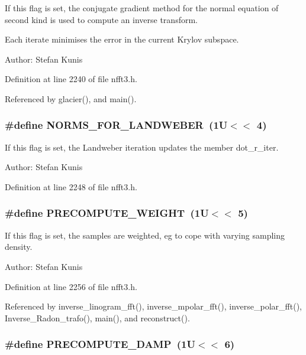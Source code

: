 If this flag is set, the conjugate gradient method for the normal equation of second kind is used to compute an inverse transform. 

Each iterate minimises the error in the current Krylov subspace.

\begin{Desc}
\item[Author:]Stefan Kunis \end{Desc}


Definition at line 2240 of file nfft3.h.

Referenced by glacier(), and main().\hypertarget{group__solver_ga39}{
\subsubsection[NORMS\_\-FOR\_\-LANDWEBER]{\setlength{\rightskip}{0pt plus 5cm}\#define NORMS\_\-FOR\_\-LANDWEBER~(1U$<$$<$ 4)}}
\label{group__solver_ga39}


If this flag is set, the Landweber iteration updates the member dot\_\-r\_\-iter. 

\begin{Desc}
\item[Author:]Stefan Kunis \end{Desc}


Definition at line 2248 of file nfft3.h.\hypertarget{group__solver_ga40}{
\subsubsection[PRECOMPUTE\_\-WEIGHT]{\setlength{\rightskip}{0pt plus 5cm}\#define PRECOMPUTE\_\-WEIGHT~(1U$<$$<$ 5)}}
\label{group__solver_ga40}


If this flag is set, the samples are weighted, eg to cope with varying sampling density. 

\begin{Desc}
\item[Author:]Stefan Kunis \end{Desc}


Definition at line 2256 of file nfft3.h.

Referenced by inverse\_\-linogram\_\-fft(), inverse\_\-mpolar\_\-fft(), inverse\_\-polar\_\-fft(), Inverse\_\-Radon\_\-trafo(), main(), and reconstruct().\hypertarget{group__solver_ga41}{
\subsubsection[PRECOMPUTE\_\-DAMP]{\setlength{\rightskip}{0pt plus 5cm}\#define PRECOMPUTE\_\-DAMP~(1U$<$$<$ 6)}}
\label{group__solver_ga41}


